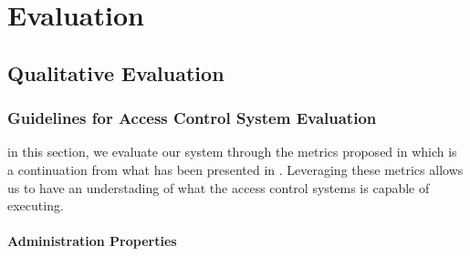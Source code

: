 \chapter{Evaluation}
\label{chap:evaluation}

\section{Qualitative Evaluation}

\subsection{Guidelines for Access Control System Evaluation}

in this section, we evaluate our system through the metrics proposed in \cite{hu_guidelines_2012} which is a continuation from what has been presented in \cite{hu_assessment_2006}. Leveraging these metrics allows us to have an understading of what the access control systems is capable of executing.

\subsubsection{Administration Properties}

